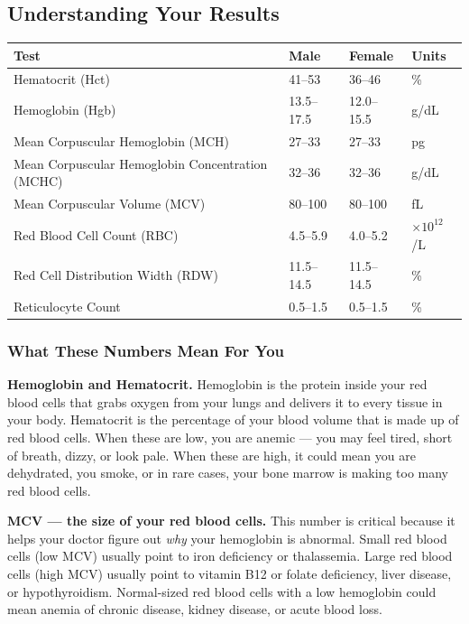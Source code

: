 \subsection{Understanding Your Results}

\begin{longtable}{@{}llll@{}}
\toprule
\textbf{Test} & \textbf{Male} & \textbf{Female} & \textbf{Units} \\
\midrule
\endhead
Hematocrit (Hct) & 41--53 & 36--46 & \% \\
Hemoglobin (Hgb) & 13.5--17.5 & 12.0--15.5 & g/dL \\
Mean Corpuscular Hemoglobin (MCH) & 27--33 & 27--33 & pg \\
Mean Corpuscular Hemoglobin Concentration (MCHC) & 32--36 & 32--36 & g/dL \\
Mean Corpuscular Volume (MCV) & 80--100 & 80--100 & fL \\
Red Blood Cell Count (RBC) & 4.5--5.9 & 4.0--5.2 & $\times 10^{12}$/L \\
Red Cell Distribution Width (RDW) & 11.5--14.5 & 11.5--14.5 & \% \\
Reticulocyte Count & 0.5--1.5 & 0.5--1.5 & \% \\
\bottomrule
\end{longtable}

\subsubsection{What These Numbers Mean For You}

\textbf{Hemoglobin and Hematocrit.} Hemoglobin is the protein inside your red blood cells that grabs oxygen from your lungs and delivers it to every tissue in your body. Hematocrit is the percentage of your blood volume that is made up of red blood cells. When these are low, you are anemic --- you may feel tired, short of breath, dizzy, or look pale. When these are high, it could mean you are dehydrated, you smoke, or in rare cases, your bone marrow is making too many red blood cells.

\textbf{MCV --- the size of your red blood cells.} This number is critical because it helps your doctor figure out \emph{why} your hemoglobin is abnormal. Small red blood cells (low MCV) usually point to iron deficiency or thalassemia. Large red blood cells (high MCV) usually point to vitamin B12 or folate deficiency, liver disease, or hypothyroidism. Normal-sized red blood cells with a low hemoglobin could mean anemia of chronic disease, kidney disease, or acute blood loss.


